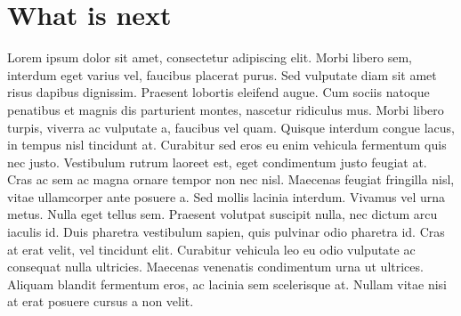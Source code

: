 \section{What is next}
Lorem ipsum dolor sit amet, consectetur adipiscing elit. Morbi libero sem,
interdum eget varius vel, faucibus placerat purus. Sed vulputate diam sit amet
risus dapibus dignissim. Praesent lobortis eleifend augue. Cum sociis natoque
penatibus et magnis dis parturient montes, nascetur ridiculus mus. Morbi libero
turpis, viverra ac vulputate a, faucibus vel quam. Quisque interdum congue
lacus, in tempus nisl tincidunt at. Curabitur sed eros eu enim vehicula
fermentum quis nec justo. Vestibulum rutrum laoreet est, eget condimentum justo
feugiat at. Cras ac sem ac magna ornare tempor non nec nisl. Maecenas feugiat
fringilla nisl, vitae ullamcorper ante posuere a. Sed mollis lacinia interdum.
Vivamus vel urna metus. Nulla eget tellus sem. Praesent volutpat suscipit nulla,
nec dictum arcu iaculis id. Duis pharetra vestibulum sapien, quis pulvinar odio
pharetra id. Cras at erat velit, vel tincidunt elit. Curabitur vehicula leo eu
odio vulputate ac consequat nulla ultricies. Maecenas venenatis condimentum
urna ut ultrices. Aliquam blandit fermentum eros, ac lacinia sem scelerisque
at. Nullam vitae nisi at erat posuere cursus a non velit.
